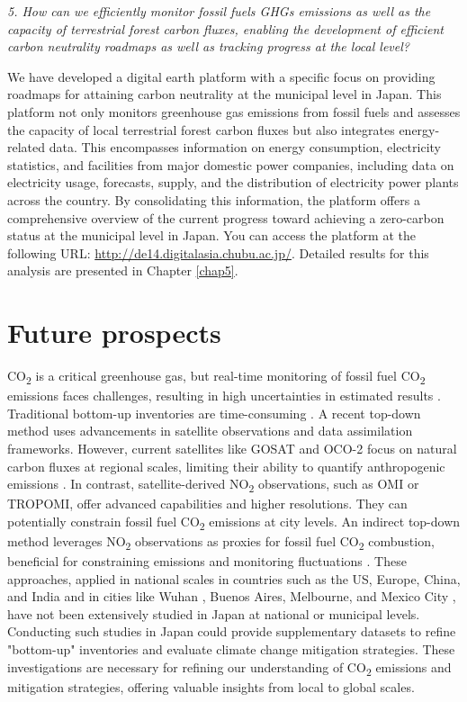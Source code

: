 \textit{5. How can we efficiently monitor fossil fuels GHGs emissions as well as the capacity of terrestrial forest carbon fluxes, enabling the development of efficient carbon neutrality roadmaps as well as tracking progress at the local level?} \par
We have developed a digital earth platform with a specific focus on providing roadmaps for attaining carbon neutrality at the municipal level in Japan. This platform not only monitors greenhouse gas emissions from fossil fuels and assesses the capacity of local terrestrial forest carbon fluxes but also integrates energy-related data. This encompasses information on energy consumption, electricity statistics, and facilities from major domestic power companies, including data on electricity usage, forecasts, supply, and the distribution of electricity power plants across the country. By consolidating this information, the platform offers a comprehensive overview of the current progress toward achieving a zero-carbon status at the municipal level in Japan. You can access the platform at the following URL: \url{http://de14.digitalasia.chubu.ac.jp/}. Detailed results for this analysis are presented in Chapter \ref{chap5}. \par

\section{Future prospects}
CO\textsubscript{2} is a critical greenhouse gas, but real-time monitoring of fossil fuel CO\textsubscript{2} emissions faces challenges, resulting in high uncertainties in estimated results \citep{marland2008uncertainties}. Traditional bottom-up inventories are time-consuming \citep{marland2008uncertainties}. A recent top-down method uses advancements in satellite observations and data assimilation frameworks. However, current satellites like GOSAT and OCO-2 focus on natural carbon fluxes at regional scales, limiting their ability to quantify anthropogenic emissions \citep{nassar2017quantifying, yang2023using}. In contrast, satellite-derived NO\textsubscript{2} observations, such as OMI or TROPOMI, offer advanced capabilities and higher resolutions. They can potentially constrain fossil fuel CO\textsubscript{2} emissions at city levels. An indirect top-down method leverages NO\textsubscript{2} observations as proxies for fossil fuel CO\textsubscript{2} combustion, beneficial for constraining emissions and monitoring fluctuations \citep{ciais2014current, goldberg2019exploiting}. These approaches, applied in national scales in countries such as the US, Europe, China, and India \citep{konovalov2016estimation, zheng2020satellite, miyazaki2023predictability} and in cities like Wuhan \citep{zhang2023quantifying}, Buenos Aires, Melbourne, and Mexico City \citep{yang2023using}, have not been extensively studied in Japan at national or municipal levels. Conducting such studies in Japan could provide supplementary datasets to refine "bottom-up" inventories and evaluate climate change mitigation strategies. These investigations are necessary for refining our understanding of CO\textsubscript{2} emissions and mitigation strategies, offering valuable insights from local to global scales. \par

